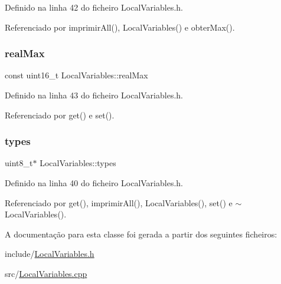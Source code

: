 Definido na linha 42 do ficheiro Local\+Variables.\+h.



Referenciado por imprimir\+All(), Local\+Variables() e obter\+Max().

\mbox{\label{classLocalVariables_a892e685ce3c1c5e6da9e1db542d865e9}} 
\subsubsection{\texorpdfstring{real\+Max}{realMax}}
{\footnotesize\ttfamily const uint16\+\_\+t Local\+Variables\+::real\+Max\hspace{0.3cm}{\ttfamily [private]}}



Definido na linha 43 do ficheiro Local\+Variables.\+h.



Referenciado por get() e set().

\mbox{\label{classLocalVariables_ac73d4583cc3f8b295c8c986cee21fe30}} 
\subsubsection{\texorpdfstring{types}{types}}
{\footnotesize\ttfamily uint8\+\_\+t$\ast$ Local\+Variables\+::types\hspace{0.3cm}{\ttfamily [private]}}



Definido na linha 40 do ficheiro Local\+Variables.\+h.



Referenciado por get(), imprimir\+All(), Local\+Variables(), set() e $\sim$\+Local\+Variables().



A documentação para esta classe foi gerada a partir dos seguintes ficheiros\+:\begin{DoxyCompactItemize}
\item 
include/\hyperlink{LocalVariables_8h}{Local\+Variables.\+h}\item 
src/\hyperlink{LocalVariables_8cpp}{Local\+Variables.\+cpp}\end{DoxyCompactItemize}
